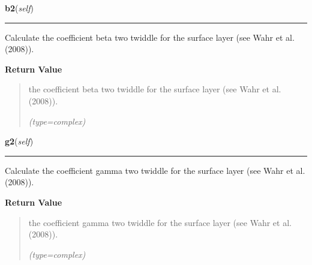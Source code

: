    \label{SatStress:SatStress:StressDef:b2}

    \vspace{0.5ex}

\hspace{.8\funcindent}\begin{boxedminipage}{\funcwidth}

    \raggedright \textbf{b2}(\textit{self})

    \vspace{-1.5ex}

    \rule{\textwidth}{0.5\fboxrule}
\setlength{\parskip}{2ex}
    Calculate the coefficient beta two twiddle for the surface layer (see 
    Wahr et al. (2008)).

\setlength{\parskip}{1ex}
      \textbf{Return Value}
    \vspace{-1ex}

      \begin{quote}
      the coefficient beta two twiddle for the surface layer (see Wahr et 
      al. (2008)).

      {\it (type=complex)}

      \end{quote}

    \end{boxedminipage}

    \label{SatStress:SatStress:StressDef:g2}

    \vspace{0.5ex}

\hspace{.8\funcindent}\begin{boxedminipage}{\funcwidth}

    \raggedright \textbf{g2}(\textit{self})

    \vspace{-1.5ex}

    \rule{\textwidth}{0.5\fboxrule}
\setlength{\parskip}{2ex}
    Calculate the coefficient gamma two twiddle for the surface layer (see 
    Wahr et al. (2008)).

\setlength{\parskip}{1ex}
      \textbf{Return Value}
    \vspace{-1ex}

      \begin{quote}
      the coefficient gamma two twiddle for the surface layer (see Wahr et 
      al. (2008)).

      {\it (type=complex)}

      \end{quote}

    \end{boxedminipage}

